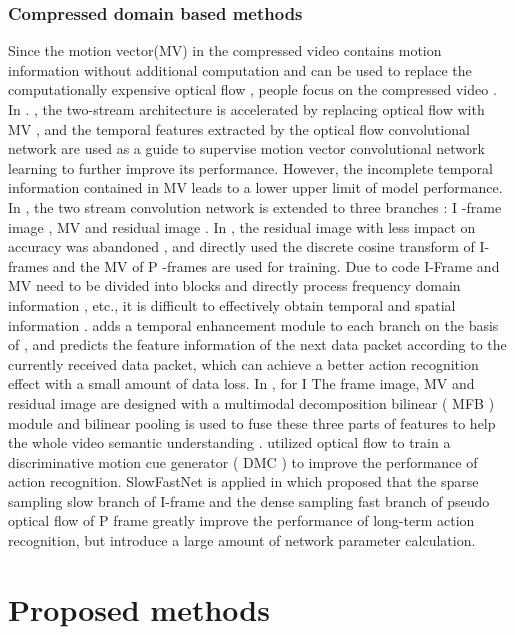\documentclass[a4paper]{cas-sc}
\begin{document}
\subsubsection{Compressed domain based methods}
Since the motion vector(MV) in the compressed video contains  motion information without additional computation and
can be used to replace the computationally expensive optical flow , 
people focus on the compressed video . 
In \cite{zhang2016real}. \cite{zhang2018real} , the two-stream architecture is accelerated by replacing optical flow with MV , 
and the temporal features extracted by the optical flow convolutional network are used 
as a guide to supervise motion vector convolutional network learning to further improve its performance.
However, the incomplete temporal information contained in MV leads to a lower upper limit of model performance. 
In \cite{wu2018compressed} , the two stream convolution network \cite{simonyan2014two} is extended to three branches : I -frame image , MV and residual image . 
In \cite{dos2020faster} , the residual image with less impact on accuracy was abandoned , 
and directly used the discrete cosine transform of I-frames and the MV of P -frames are used for training. 
Due to code I-Frame and MV need to be divided into blocks and directly process frequency domain information , etc., 
it is difficult to effectively obtain temporal and spatial information . 
\cite{li2021towards} adds a temporal enhancement module to each branch on the basis of \cite{wu2018compressed} , 
and predicts the feature information of the next data packet according to the currently received data packet, 
which can achieve a better action recognition effect with a small amount of data loss. 
In \cite{huo2019mobile}, for I The frame image, 
MV and residual image are designed with a multimodal decomposition bilinear ( MFB ) module and bilinear pooling 
is used to fuse these three parts of features to help the whole video semantic understanding . 
\cite{shou2019dmc} utilized optical flow to train a discriminative motion cue generator ( DMC ) to improve the performance of action recognition. 
SlowFastNet is applied in \cite{li2020slow} which proposed that the sparse sampling slow branch of I-frame and 
the dense sampling fast branch of pseudo optical flow of P frame greatly improve the performance of long-term action recognition, 
but introduce a large amount of network parameter calculation.

\section{Proposed methods}
\end{document}
